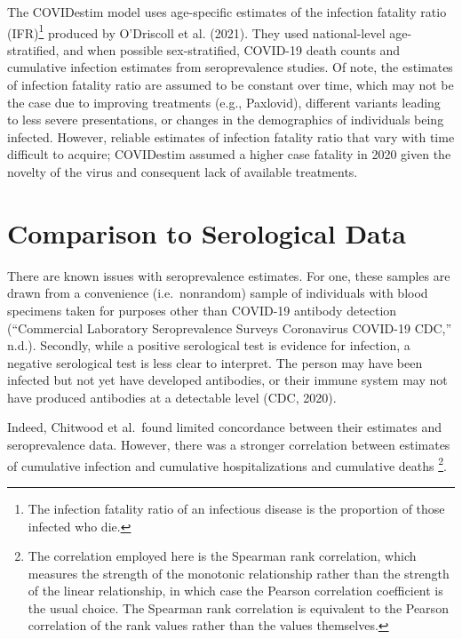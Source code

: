\documentclass[12pt,twoside]{smiththesis}
\begin{document}
The COVIDestim model uses age-specific estimates of the infection fatality ratio (IFR)\footnote{The infection fatality ratio of an infectious disease is the proportion of those infected who die.} produced by O'Driscoll et al. (2021). They used national-level age-stratified, and when possible sex-stratified, COVID-19 death counts and cumulative infection estimates from seroprevalence studies. Of note, the estimates of infection fatality ratio are assumed to be constant over time, which may not be the case due to improving treatments (e.g., Paxlovid), different variants leading to less severe presentations, or changes in the demographics of individuals being infected. However, reliable estimates of infection fatality ratio that vary with time difficult to acquire; COVIDestim assumed a higher case fatality in 2020 given the novelty of the virus and consequent lack of available treatments.

\hypertarget{comparison-to-serological-data}{%
\section{Comparison to Serological Data}\label{comparison-to-serological-data}}

There are known issues with seroprevalence estimates. For one, these samples are drawn from a convenience (i.e.~nonrandom) sample of individuals with blood specimens taken for purposes other than COVID-19 antibody detection ({``Commercial {Laboratory Seroprevalence Surveys} \textbar{} {Coronavirus} \textbar{} {COVID-19} \textbar{} {CDC},''} n.d.). Secondly, while a positive serological test is evidence for infection, a negative serological test is less clear to interpret. The person may have been infected but not yet have developed antibodies, or their immune system may not have produced antibodies at a detectable level (CDC, 2020).

Indeed, Chitwood et al.~found limited concordance between their estimates and seroprevalence data. However, there was a stronger correlation between estimates of cumulative infection and cumulative hospitalizations and cumulative deaths \footnote{The correlation employed here is the Spearman rank correlation, which measures the strength of the monotonic relationship rather than the strength of the linear relationship, in which case the Pearson correlation coefficient is the usual choice. The Spearman rank correlation is equivalent to the Pearson correlation of the rank values rather than the values themselves. }.
\end{document}
